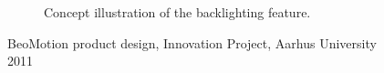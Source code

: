 \begin{figure}[ht]
\begin{subfigure}{.45\textwidth}
		\caption{Concept illustration of the backlighting feature.}
		\label{fig:beomotion:concept_backlight}
	\end{subfigure}
	\caption{BeoMotion product design, Innovation Project, Aarhus University 2011}
	\label{fig:beomotion}
\end{figure}
